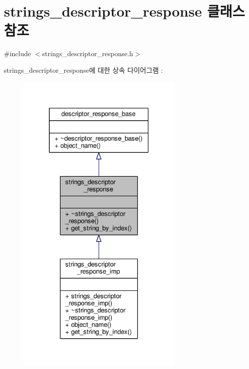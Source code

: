 \hypertarget{classavdecc__lib_1_1strings__descriptor__response}{}\section{strings\+\_\+descriptor\+\_\+response 클래스 참조}
\label{classavdecc__lib_1_1strings__descriptor__response}


{\ttfamily \#include $<$strings\+\_\+descriptor\+\_\+response.\+h$>$}



strings\+\_\+descriptor\+\_\+response에 대한 상속 다이어그램 \+: 
\nopagebreak
\begin{figure}[H]
\begin{center}
\leavevmode
\includegraphics[width=232pt]{classavdecc__lib_1_1strings__descriptor__response__inherit__graph}
\end{center}
\end{figure}


